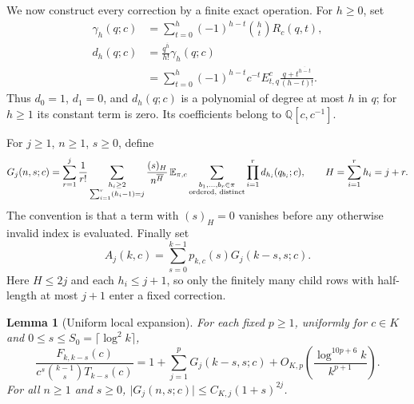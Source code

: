 \documentclass[11pt,letterpaper]{article}
\newtheorem{lemma}[theorem]{Lemma}\newtheorem{proposition}[theorem]{Proposition}\newtheorem{corollary}[theorem]{Corollary}
\theoremstyle{remark}\newtheorem{remark}[theorem]{Remark}
\newcommand{\fall}[2]{(#1)_{#2}}\newcommand{\rise}[2]{#1^{\overline{#2}}}
\theoremstyle{definition}\newtheorem{definition}[theorem]{Definition}
\begin{document}
We now construct every correction by a finite exact operation.
For \(h\ge0\), set
\begin{align}
 \gamma_h(q;c)
 &=\sum_{t=0}^h(-1)^{h-t}\binom ht R_c(q,t),\label{sgm:md:cm:newton}\\
 d_h(q;c)
 &=\frac{\rise{q}{h}}{h!}\gamma_h(q;c)\nonumber\\
 &=\sum_{t=0}^h(-1)^{h-t}c^{-t}E^c_{t,q}
                     \frac{\rise{q+t}{h-t}}{(h-t)!}.\label{sgm:md:cm:d}
\end{align}
Thus \(d_0=1\), \(d_1=0\), and \(d_h(q;c)\) is a polynomial of
degree at most \(h\) in \(q\); for \(h\ge1\) its constant term is zero.
Its coefficients belong to \(\mathbb Q[c,c^{-1}]\).

For \(j\ge1\), \(n\ge1\), \(s\ge0\), define
\begin{equation}\label{sgm:md:cm:G}
 G_j(n,s;c)=
 \sum_{r=1}^j\frac1{r!}
 \sum_{\substack{h_i\ge2\\\sum_{i=1}^r(h_i-1)=j}}
 \frac{\fall{s}{H}}{\rise{n}{H}}\,
 \E_{\pi,c}
 \sum_{\substack{b_1,\ldots,b_r\in\pi\\\text{ordered, distinct}}}
                  \prod_{i=1}^r d_{h_i}(q_{b_i};c),
 \qquad H=\sum_{i=1}^rh_i=j+r .
\end{equation}
The convention is that a term with \(\fall{s}{H}=0\) vanishes
before any otherwise invalid index is evaluated.
Finally set
\begin{equation}\label{sgm:md:cm:Aj}
 A_j(k,c)=\sum_{s=0}^{k-1}p_{k,c}(s)G_j(k-s,s;c).
\end{equation}
Here \(H\le2j\) and each \(h_i\le j+1\), so only the finitely
many child rows with half-length at most \(j+1\) enter a fixed
correction.

\begin{lemma}[Uniform local expansion]\label{sgm:md:cm:local}
For each fixed \(p\ge1\), uniformly for \(c\in K\) and
\(0\le s\le S_0=\lceil\log^2k\rceil\),
\begin{equation}\label{sgm:md:cm:root-expansion}
 \frac{F_{k,k-s}(c)}
      {c^s\binom{k-1}{s}T_{k-s}(c)}
 =1+\sum_{j=1}^pG_j(k-s,s;c)
    +O_{K,p}\left(\frac{\log^{10p+6}k}{k^{p+1}}\right).
\end{equation}
For all \(n\ge1\) and \(s\ge0\),
\(\lvert G_j(n,s;c)\rvert\le C_{K,j}(1+s)^{2j}\).
\end{lemma}
\end{document}
